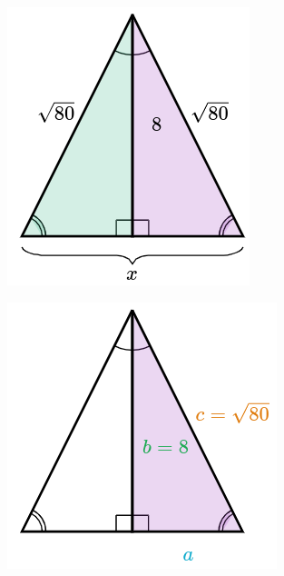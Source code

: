 \begin{solutionbox}{14cm}
    \begin{minipage}{0.2\textwidth}
        \begin{figure}[H]
            \centering
            \includegraphics[width=0.75\linewidth]{../images/pitagoras9a.png}
            \caption{}
            \label{fig:pitagoras9a}
        \end{figure}
        \begin{figure}[H]
            \centering
            \includegraphics[width=0.75\linewidth]{../images/pitagoras9b.png}
            \caption{}
            \label{fig:pitagoras9b}

\end{figure}
\end{minipage}
\end{solutionbox}

